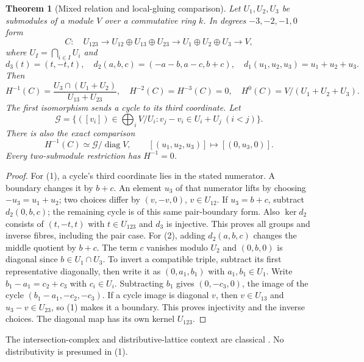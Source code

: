 \documentclass[10pt,a4paper]{article}
\newtheorem{theorem}{Theorem}
\begin{document}
\begin{theorem}[Mixed relation and local-gluing comparison]
Let $U_1,U_2,U_3$ be submodules of a module $V$ over a commutative ring $k$.
In degrees $-3,-2,-1,0$ form
\[
 C:\quad U_{123}\longrightarrow U_{12}\oplus U_{13}\oplus U_{23}
 \longrightarrow U_1\oplus U_2\oplus U_3\longrightarrow V,
\]
where $U_I=\bigcap_{i\in I}U_i$ and
\[
 d_3(t)=(t,-t,t),\quad d_2(a,b,c)=(-a-b,a-c,b+c),\quad
 d_1(u_1,u_2,u_3)=u_1+u_2+u_3.
\]
Then
\[
 \boxed{H^{-1}(C)=
 \frac{U_3\cap(U_1+U_2)}{U_{13}+U_{23}},\quad
 H^{-2}(C)=H^{-3}(C)=0,\quad H^0(C)=V/(U_1+U_2+U_3).}       \tag{1}
\]
The first isomorphism sends a cycle to its third coordinate. Let
\[
 \mathcal G=\{([v_i])\in\textstyle\bigoplus_iV/U_i:
                         v_j-v_i\in U_i+U_j\ (i<j)\}.
\]
There is also the exact comparison
\[
 \boxed{H^{-1}(C)\simeq\mathcal G/\operatorname{diag}V,
 \qquad[(u_1,u_2,u_3)]\longmapsto[(0,u_3,0)].}              \tag{2}
\]
Every two-submodule restriction has $H^{-1}=0$.
\end{theorem}
\begin{proof}
For (1), a cycle's third coordinate lies in the stated numerator.
A boundary changes it by $b+c$. An element $u_3$ of that numerator lifts
by choosing $-u_3=u_1+u_2$; two choices differ by $(v,-v,0)$,
$v\in U_{12}$. If $u_3=b+c$, subtract $d_2(0,b,c)$; the remaining
cycle is of this same pair-boundary form. Also $\ker d_2$ consists of
$(t,-t,t)$ with $t\in U_{123}$ and $d_3$ is injective. This proves all
groups and inverse fibres, including the pair case.
For (2), adding $d_2(a,b,c)$ changes the middle quotient by $b+c$.
The term $c$ vanishes modulo $U_2$ and $(0,b,0)$ is diagonal since
$b\in U_1\cap U_3$. To invert a compatible triple, subtract its first
representative diagonally, then write it as $(0,a_1,b_1)$ with
$a_1,b_1\in U_1$. Write $b_1-a_1=c_2+c_3$ with $c_i\in U_i$.
Subtracting $b_1$ gives $(0,-c_3,0)$, the image of the cycle
$(b_1-a_1,-c_2,-c_3)$. If a cycle image is diagonal $v$, then $v\in U_{13}$ and
$u_3-v\in U_{23}$, so (1) makes it a boundary. This proves injectivity and
the inverse choices. The diagonal map has its own kernel $U_{123}$.
\end{proof}
The intersection-complex and distributive-lattice context are classical
\cite[\S2.1, (5)--(8); \S3]{Mas}. No distributivity is presumed in (1).

\newpage
\end{document}

